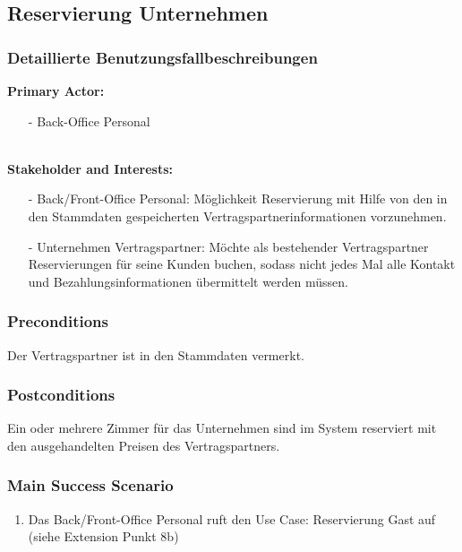 \documentclass[./detailed_overview_usecases.tex]{subfiles}
\begin{document}
    \subsection{Reservierung Unternehmen}
    \subsubsection{Detaillierte Benutzungsfallbeschreibungen}

    \textbf{Primary Actor: }
    \begin{itemize}
        \item [-] Back-Office Personal
    \end{itemize}
    \\
    \textbf{Stakeholder and Interests:}
    \begin{itemize}
        \item[-] Back/Front-Office Personal: Möglichkeit Reservierung mit Hilfe von den in den Stammdaten gespeicherten Vertragspartnerinformationen vorzunehmen.
        \item[-] Unternehmen Vertragspartner: Möchte als bestehender Vertragspartner Reservierungen für seine Kunden buchen, sodass nicht jedes Mal alle Kontakt und Bezahlungsinformationen übermittelt werden müssen.
    \end{itemize}

    \subsubsection*{Preconditions}
    Der Vertragspartner ist in den Stammdaten vermerkt.

    \subsubsection*{Postconditions}
    Ein oder mehrere Zimmer für das Unternehmen sind im System reserviert mit den ausgehandelten Preisen des Vertragspartners.

    \subsubsection*{Main Success Scenario}
    \begin{enumerate}
        \item Das Back/Front-Office Personal ruft den Use Case: Reservierung Gast auf (siehe Extension Punkt 8b)
    \end{enumerate}
\end{document}
